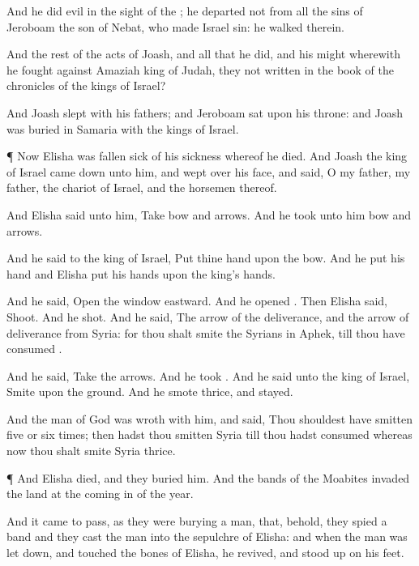 {And he
did
{}
evil in the
sight of the
{}; he
departed not from all the
sins of
Jeroboam the
son of
Nebat, who made
Israel
sin:
{} he
walked therein.

And the
rest of the
acts of
Joash, and all that he
did, and his
might wherewith he
fought against
Amaziah
king of
Judah,
{} they not
written in the
book of the
chronicles of the
kings of
Israel?

And
Joash
slept with his
fathers; and
Jeroboam
sat upon his
throne: and
Joash was
buried in
Samaria with the
kings of
Israel.


\par }{\PP {}¶ Now
Elisha was fallen
sick of his
sickness whereof he
died. And
Joash the
king of
Israel came
down unto him, and
wept over his
face, and
said, O my
father, my
father, the
chariot of
Israel, and the
horsemen thereof.

And
Elisha
said unto him,
Take
bow and
arrows. And he
took unto him
bow and
arrows.

And he
said to the
king of
Israel,
Put thine
hand upon the
bow. And he
put his
hand
{} and
Elisha
put his
hands upon the
king’s
hands.

And he
said,
Open the
window
eastward. And he
opened
{}. Then
Elisha
said,
Shoot. And he
shot. And he
said, The
arrow of the
{}
deliverance, and the
arrow of
deliverance from
Syria: for thou shalt
smite the
Syrians in
Aphek, till thou have
consumed
{}.

And he
said,
Take the
arrows. And he
took
{}. And he
said unto the
king of
Israel,
Smite upon the
ground. And he
smote
thrice, and
stayed.

And the
man of
God was
wroth with him, and
said, Thou shouldest have
smitten
five or
six
times; then hadst thou
smitten
Syria till thou hadst
consumed
{} whereas now thou shalt
smite
Syria
{}
thrice.


\par }{\PP {}¶ And
Elisha
died, and they
buried him. And the
bands of the
Moabites
invaded the
land at the coming
in of the
year.

And it came to pass, as they were
burying a
man, that, behold, they
spied a
band
{} and they
cast the
man into the
sepulchre of
Elisha: and when the
man was let
down, and
touched the
bones of
Elisha, he
revived, and stood
up on his
feet.


}
